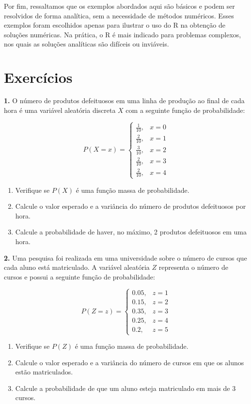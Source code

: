 \documentclass[
]{book}
\begin{document}
Por fim, ressaltamos que os exemplos abordados aqui são básicos e podem ser resolvidos de forma analítica, sem a necessidade de métodos numéricos. Esses exemplos foram escolhidos apenas para ilustrar o uso do R na obtenção de soluções numéricas. Na prática, o R é mais indicado para problemas complexos, nos quais as soluções analíticas são difíceis ou inviáveis.

\section{Exercícios}\label{exercuxedcios-22}

\textbf{1.} O número de produtos defeituosos em uma linha de produção ao final de cada hora é uma variável aleatória discreta \(X\) com a seguinte função de probabilidade:

\[P(X = x) =
\begin{cases}
\frac{1}{10}, & x = 0 \\
\frac{2}{10}, & x = 1 \\
\frac{3}{10}, & x = 2 \\
\frac{2}{10}, & x = 3 \\
\frac{2}{10}, & x = 4
\end{cases}\]

\begin{enumerate}
\def\labelenumi{(\alph{enumi})}
\item
  Verifique se \(P(X)\) é uma função massa de probabilidade.
\item
  Calcule o valor esperado e a variância do número de produtos defeituosos por hora.
\item
  Calcule a probabilidade de haver, no máximo, 2 produtos defeituosos em uma hora.
\end{enumerate}

\textbf{2.} Uma pesquisa foi realizada em uma universidade sobre o número de cursos que cada aluno está matriculado. A variável aleatória \(Z\) representa o número de cursos e possui a seguinte função de probabilidade:

\[P(Z = z) =
\begin{cases}
0.05, & z = 1 \\
0.15, & z = 2 \\
0.35, & z = 3 \\
0.25, & z = 4 \\
0.2, & z = 5
\end{cases}\]

\begin{enumerate}
\def\labelenumi{(\alph{enumi})}
\item
  Verifique se \(P(Z)\) é uma função massa de probabilidade.
\item
  Calcule o valor esperado e a variância do número de cursos em que os alunos estão matriculados.
\item
  Calcule a probabilidade de que um aluno esteja matriculado em mais de 3 cursos.
\end{enumerate}
\end{document}
